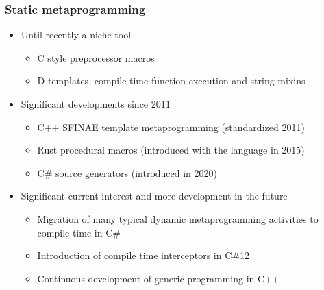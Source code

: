 \begin{frame}
	\frametitle{Static metaprogramming}

	\begin{itemize}
		\item Until recently a niche tool \begin{itemize}
			      \item C style preprocessor macros
			      \item D templates, compile time function execution and string mixins
		      \end{itemize}
		\item Significant developments since 2011\begin{itemize}
			      \item C++ SFINAE template metaprogramming (standardized 2011)
			      \item Rust procedural macros (introduced with the language in 2015)
			      \item C\# source generators (introduced in 2020)
		      \end{itemize}

		\item Significant current interest and more development in the future\begin{itemize}
			      \item Migration of many typical dynamic metaprogramming activities to compile time in C\#
			      \item Introduction of compile time interceptors in C\#12
			      \item Continuous development of generic programming in C++
		      \end{itemize}
	\end{itemize}

\end{frame}

